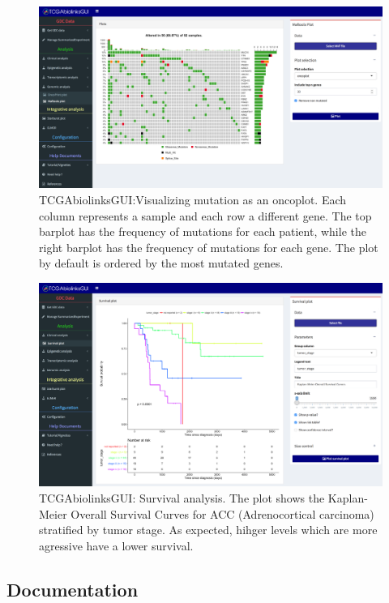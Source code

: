 \begin{figure}
\includegraphics[width=1.0\linewidth]{images/maftools_oncoplot.png}
\caption[TCGAbiolinksGUI: Visualizing mutation as an oncoplot]{TCGAbiolinksGUI:Visualizing mutation as an oncoplot. Each column
represents a sample and each row a different gene. The top barplot has the frequency of mutations for each patient, while
the right barplot has the frequency of mutations for each gene. The plot by default is ordered by the most mutated genes.}
\label{fig:maftools_oncoplot}
\end{figure}


\begin{figure}[]
\includegraphics[width=1.0\linewidth]{images/gui_acc_survival.png}
\caption[TCGAbiolinksGUI: Survival analysis]{TCGAbiolinksGUI: Survival analysis.
The plot shows the Kaplan-Meier Overall Survival Curves for ACC (Adrenocortical carcinoma) stratified by tumor stage.
As expected, hihger levels which are more agressive have a lower survival.}
\label{fig:gui_survival}
\end{figure}

\subsection{Documentation}

